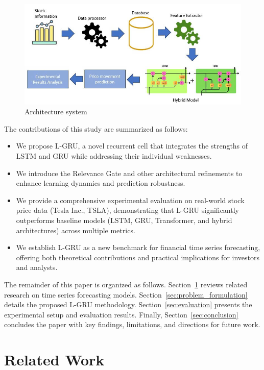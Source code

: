 \documentclass{cys}
\begin{document}
\begin{figure}
    \centering
    \includegraphics[width=\linewidth]{Figure/sysytem.PNG}
    \caption{Architecture system}
    \label{fig:placeholder}
\end{figure}

The contributions of this study are summarized as follows:
\begin{itemize}
    \item We propose L-GRU, a novel recurrent cell that integrates the strengths of LSTM and GRU while addressing their individual weaknesses.
    \item We introduce the Relevance Gate and other architectural refinements to enhance learning dynamics and prediction robustness.
    \item We provide a comprehensive experimental evaluation on real-world stock price data (Tesla Inc., TSLA), demonstrating that L-GRU significantly outperforms baseline models (LSTM, GRU, Transformer, and hybrid architectures) across multiple metrics.
    \item We establish L-GRU as a new benchmark for financial time series forecasting, offering both theoretical contributions and practical implications for investors and analysts.
\end{itemize}

The remainder of this paper is organized as follows. Section~\ref{sec:related_work} reviews related research on time series forecasting models. Section~\ref{sec:problem_formulation} details the proposed L-GRU methodology. Section~\ref{sec:evaluation} presents the experimental setup and evaluation results. Finally, Section~\ref{sec:conclusion} concludes the paper with key findings, limitations, and directions for future work.



\section{Related Work}\label{sec:related_work}
\end{document}

